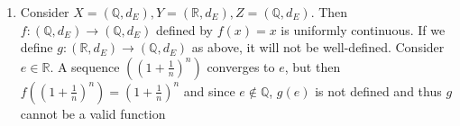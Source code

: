 \documentclass[letterpaper, 11pt]{article}
\newcommand{\R}{\mathbb{R}}   %
\newcommand{\Q}{\mathbb{Q}}   %
\newcommand{\1}{\mathds{1}}	%
\theoremstyle{definition}
\begin{document}
\begin{enumerate}[label=(\alph*)]
\item Consider $X = (\Q, d_E), Y = (\R, d_E), Z = (\Q, d_E)$. Then $f: (\Q, d_E) \to (\Q, d_E)$ defined by $f(x) = x$ is uniformly continuous. If we define $g: (\R, d_E) \to (\Q, d_E)$ as above, it will not be well-defined. Consider $e \in \R$. A sequence $((1+\frac{1}{n})^n)$ converges to $e$, but then $f((1+\frac{1}{n})^n) = (1+\frac{1}{n})^n$ and since $e \notin \Q$, $g(e)$ is not defined and thus $g$ cannot be a valid function

\end{enumerate}
\end{document}
